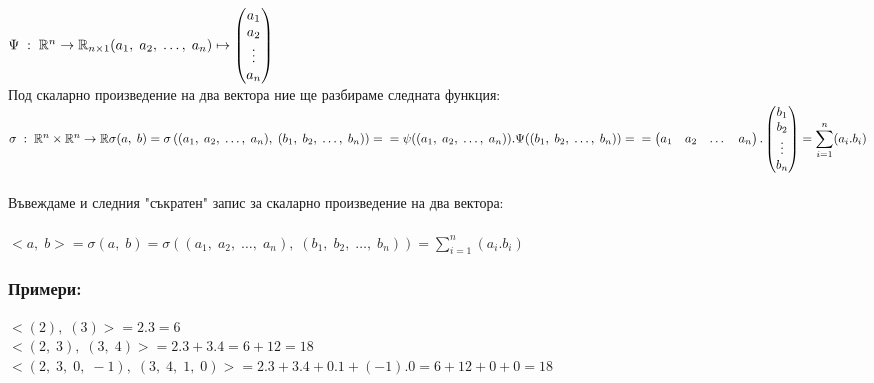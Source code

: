 \documentclass[12pt]{article}
\newcommand{\R}{\mathbb{R}}
\begin{document}
$\Psi \; : \; \R^n \to \R_{n \times 1} \\
(a_1, \; a_2, \; \dots, \; a_n) \mapsto \begin{pmatrix}
    a_1 \\
    a_2 \\
    \vdots \\
    a_n
\end{pmatrix} $ \\

Под скаларно произведение на два вектора ние ще разбираме следната функция: \\

$\sigma \; : \; \R^n \times \R^n \to \R \\
\sigma(a, \; b) = \sigma\left((a_1, \; a_2, \; \dots, \; a_n) , \; (b_1, \; b_2, \; \dots, \; b_n) \right) = \\
= \psi((a_1, \; a_2, \; \dots, \; a_n)).\Psi((b_1, \; b_2, \; \dots, \; b_n)) = \\\\
= \begin{pmatrix}
    a_1 & a_2 & \dots & a_n
\end{pmatrix}.\begin{pmatrix}
    b_1 \\
    b_2 \\
    \vdots \\
    b_n
\end{pmatrix} = \displaystyle\sum_{i = 1}^n (a_i.b_i)$ \\\\

Въвеждаме и следния "съкратен" \; запис за скаларно произведение на два вектора: \\\\
$<a, \; b> = \sigma(a, \; b) = \sigma\left((a_1, \; a_2, \; \dots, \; a_n) , \; (b_1, \; b_2, \; \dots, \; b_n) \right) = \displaystyle\sum_{i = 1}^n (a_i.b_i)$

\subsubsection*{Примери:}

$<(2), \; (3)> = 2.3 = 6$ \\

$<(2, \; 3), \; (3, \; 4)> = 2.3 + 3.4 = 6 + 12 = 18$ \\

$<(2, \; 3, \; 0, \; -1), \; (3, \; 4, \; 1, \; 0)> = 2.3 + 3.4 + 0.1 + (-1).0 = 6 + 12 + 0 + 0 = 18$ \\
\end{document}
